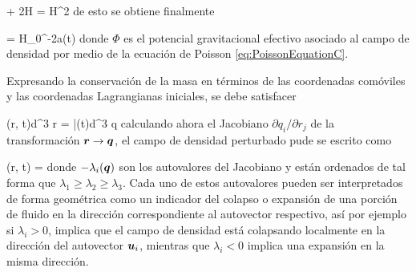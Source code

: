 {  + 2H =
 H^2 \bds \Psi  }
de esto se obtiene finalmente


{ \bds \Psi = H_0^{-2}a(t)\nabla \Phi  }
donde $\Phi$ es el potencial gravitacional efectivo asociado al campo de 
densidad por medio de la ecuación de Poisson \ref{eq:PoissonEquationC}.


Expresando la conservación de la masa en términos de las coordenadas 
comóviles y las coordenadas Lagrangianas iniciales, se debe satisfacer


{ \rho(\bds r, t)d^3 \bds r = \bar{\rho}(t)d^3 \bds q  }
calculando ahora el Jacobiano $\partial q_i / \partial r_j$ de la 
transformación $\boldsymbol{ r } \rightarrow \boldsymbol{ q }$, el campo de densidad perturbado 
pude se escrito como \cite{padmanabhan1995}


{ \rho(\bds r, t) =  }
donde $-\lambda_i(\boldsymbol{ q })$ son los autovalores del Jacobiano y están 
ordenados de tal forma que $\lambda_1\geq\lambda_2\geq\lambda_3$. Cada uno
de estos autovalores pueden ser interpretados de forma geométrica como un 
indicador del colapso o expansión de una porción de fluido en la dirección
correspondiente al autovector respectivo, así por ejemplo si $\lambda_i > 0$,
implica que el campo de densidad está colapsando localmente en la dirección 
del autovector $\boldsymbol{ u }_i$, mientras que $\lambda_i < 0$ implica una 
expansión en la misma dirección.

